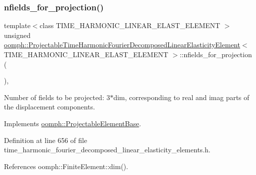 \subsubsection{\texorpdfstring{nfields\+\_\+for\+\_\+projection()}{nfields\_for\_projection()}}
{\footnotesize\ttfamily template$<$class T\+I\+M\+E\+\_\+\+H\+A\+R\+M\+O\+N\+I\+C\+\_\+\+L\+I\+N\+E\+A\+R\+\_\+\+E\+L\+A\+S\+T\+\_\+\+E\+L\+E\+M\+E\+NT $>$ \\
unsigned \hyperlink{classoomph_1_1ProjectableTimeHarmonicFourierDecomposedLinearElasticityElement}{oomph\+::\+Projectable\+Time\+Harmonic\+Fourier\+Decomposed\+Linear\+Elasticity\+Element}$<$ T\+I\+M\+E\+\_\+\+H\+A\+R\+M\+O\+N\+I\+C\+\_\+\+L\+I\+N\+E\+A\+R\+\_\+\+E\+L\+A\+S\+T\+\_\+\+E\+L\+E\+M\+E\+NT $>$\+::nfields\+\_\+for\+\_\+projection (\begin{DoxyParamCaption}{ }\end{DoxyParamCaption})\hspace{0.3cm}{\ttfamily [inline]}, {\ttfamily [virtual]}}



Number of fields to be projected\+: 3$\ast$dim, corresponding to real and imag parts of the displacement components. 



Implements \hyperlink{classoomph_1_1ProjectableElementBase_a44634aa4049332a580d249c25564638c}{oomph\+::\+Projectable\+Element\+Base}.



Definition at line 656 of file time\+\_\+harmonic\+\_\+fourier\+\_\+decomposed\+\_\+linear\+\_\+elasticity\+\_\+elements.\+h.



References oomph\+::\+Finite\+Element\+::dim().

\mbox{\label{classoomph_1_1ProjectableTimeHarmonicFourierDecomposedLinearElasticityElement_a907adc47e9267b2eca42631dc95c5af4}} 
